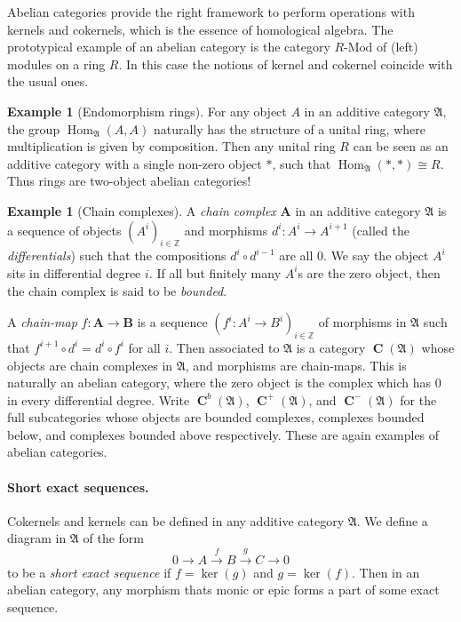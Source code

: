 \documentclass[a4paper]{article}
\theoremstyle{definition}
\newtheorem{example}[defn]{Example}
\theoremstyle{remark}
\newcommand{\Mod}{\ensuremath{\text{-Mod}}}
\DeclareMathOperator{\Hom}{\text{Hom}}
\DeclareMathOperator{\Ch}{\mathbf{C}}
\begin{document}
Abelian categories provide the right framework to perform operations with
kernels and cokernels, which is the essence of homological algebra. The
prototypical example of an abelian category is the category \(R\Mod\) of
(left) modules on a ring \(R\). In this case the notions of kernel and cokernel
coincide with the usual ones. 

\begin{example}[Endomorphism rings] \label{ring-additive}
    For any object \(A\) in an additive category \(\mathfrak{A}\), the group
    \(\Hom_\mathfrak{A}(A,A)\) naturally has the structure of a unital ring, where
    multiplication is given by composition. Then any unital ring \(R\) can be
    seen as an additive category with a single non-zero object \(\ast\), such
    that \(\Hom_\mathfrak{A}(\ast,\ast)\cong R\). Thus rings are two-object
    abelian categories!  
\end{example}

\begin{example}[Chain complexes] 
    A \textit{chain complex} \(\mathbf{A}\) in an additive category
    \(\mathfrak{A}\) is a sequence of objects \((A^i)_{i\in\mathbb{Z}}\) and
    morphisms \(d^i:A^i\rightarrow A^{i+1}\) (called the \textit{differentials})
    such that the compositions \(d^i\circ d^{i-1}\) are all \(0\). We say the
    object \(A^i\) sits in differential degree \(i\). If all but finitely many
    \(A^i\)s are the zero object, then the chain complex is said to be
    \textit{bounded}.

    A \textit{chain-map} \(f: \mathbf{A} \rightarrow
    \mathbf{B}\) is a sequence \((f^i:A^i\rightarrow B^i)_{i\in \mathbb{Z}}\) of
    morphisms in \(\mathfrak{A}\) such that \({f^{i+1}\circ d^i = d^i \circ
    f^i}\) for all \(i\). Then associated to \(\mathfrak{A}\) is a category
    \(\Ch(\mathfrak{A})\) whose objects are chain complexes in \(\mathfrak{A}\),
    and morphisms are chain-maps. This is naturally an abelian category, where
    the zero object is the complex which has \(0\) in every differential degree.
    Write \(\Ch^b(\mathfrak{A})\), \(\Ch^+(\mathfrak{A})\), and
    \(\Ch^-(\mathfrak{A})\) for the full subcategories whose objects are
    bounded complexes, complexes bounded below, and complexes bounded
    above respectively. These are again examples of abelian categories.
\end{example}

\paragraph{Short exact sequences.} Cokernels and kernels can be defined in any
additive category \(\mathfrak{A}\).  We define a diagram in \(\mathfrak{A}\) of
the form 
\[0\rightarrow A\xrightarrow{\;f\;} B \xrightarrow{\;g\;} C\rightarrow 0\] 
to be a \textit{short exact sequence} if \(f=\ker(g)\) and \(g=\ker(f)\). Then
in an abelian category, any morphism thats monic or epic forms a part of some
exact sequence.
\end{document}
